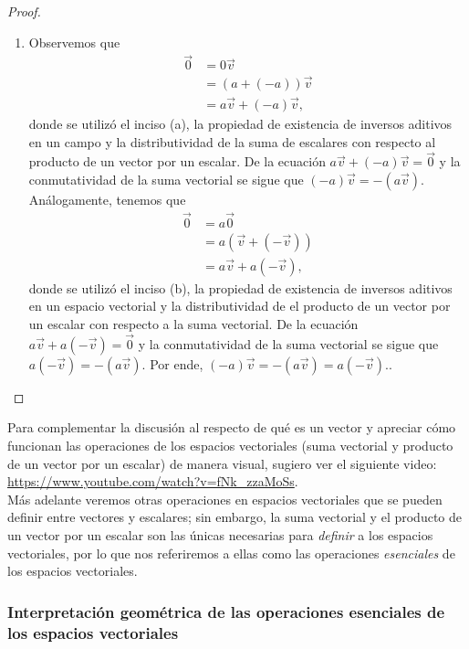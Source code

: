 \documentclass[notasLineal]{subfiles}
\begin{document}
\begin{proof}
\begin{enumerate}[label=(\alph*)]
        \item Observemos que
            \begin{align*}
                \vec{0} &= 0\vec{v} \\
                           &= (a+(-a)) \vec{v} \\
                           &= a\vec{v} + (-a)\vec{v},
            \end{align*}
            donde se utilizó el inciso (a), la propiedad de existencia de inversos aditivos en un campo y la distributividad de la suma de escalares con respecto al producto de un vector por un escalar. De la ecuación $a\vec{v} + (-a)\vec{v} = \vec{0}$ y la conmutatividad de la suma vectorial se sigue que $(-a)\vec{v} = -(a\vec{v})$. Análogamente, tenemos que
            \begin{align*}
                \vec{0} &= a\vec{0} \\
                           &= a(\vec{v} + (-\vec{v})) \\
                           &= a\vec{v} + a(-\vec{v}),
            \end{align*}
            donde se utilizó el inciso (b), la propiedad de existencia de inversos aditivos en un espacio vectorial y la distributividad de el producto de un vector por un escalar con respecto a la suma vectorial. De la ecuación $a\vec{v}+a(-\vec{v}) = \vec{0}$ y la conmutatividad de la suma vectorial se sigue que $a(-\vec{v}) = -(a\vec{v})$. Por ende, $(-a)\vec{v} = -(a\vec{v}) = a(-\vec{v})$..

    \end{enumerate}
\end{proof}

Para complementar la discusión al respecto de qué es un vector y apreciar cómo funcionan las operaciones de los espacios vectoriales (suma vectorial y producto de un vector por un escalar) de manera visual, sugiero ver el siguiente video: \url{https://www.youtube.com/watch?v=fNk_zzaMoSs}. \\

Más adelante veremos otras operaciones en espacios vectoriales que se pueden definir entre vectores y escalares; sin embargo, la suma vectorial y el producto de un vector por un escalar son las únicas necesarias para \emph{definir} a los espacios vectoriales, por lo que nos referiremos a ellas como las operaciones \emph{esenciales} de los espacios vectoriales.

\subsubsection*{Interpretación geométrica de las operaciones esenciales de los espacios vectoriales} \label{Sssec:Interpretación geométrica de las operaciones de los espacios vectoriales}
\end{document}
